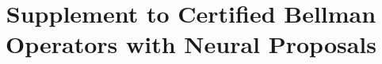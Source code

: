 

\begin{frontmatter}
\title{Supplement to Certified Bellman Operators with Neural Proposals}
\begin{aug}\author[id=au1,addressref={add1}]{~}\address[id=add1]{}\end{aug}
\end{frontmatter}

\clearpage

